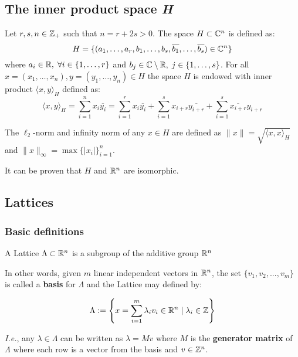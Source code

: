 \documentclass[a4paper,12pt]{article}
\begin{document}
\subsection{The inner product space \emph{H}}
\label{sec:org8f4e4a1}
\begin{definition}
  \label{def:h-space}
  Let $r,s,n \in \mathbb{Z}_+$ such that $n = r + 2s > 0$. The space $H \subset \mathbb{C}^n$ is defined
  as:
  \begin{equation*}
    H = \{(a_1,\dots, a_r, b_1,\dots, b_s, \overline{b_1}, \dots, \overline{b_s}) \in \mathbb{C}^n\}
  \end{equation*}
  where $a_i \in \mathbb{R}, \; \forall i \in \{1,\dots,r\}$ and $b_j \in \mathbb{C} \setminus \mathbb{R}, \; j \in \{1,\dots,
  s\}$. For all $x = \left(x_1, \dots, x_n\right), y = \left(y_1, \dots, y_n\right) \in H$ the space
  $H$ is endowed with inner product $\langle {x,y} \rangle_H$ defined as:
  \begin{equation*}
    \langle {x,y} \rangle_H = \sum_{i=1}^n{x_i \overline{y_i}} = \sum_{i=1}^r{x_i \overline{y_i}} + \sum_{i=1}^s{x_{i+r} \overline{y_{i+r}}} + \sum_{i=1}^s{\overline{x_{i+r}} y_{i+r}}
  \end{equation*}

  The $\ell_2$-norm and infinity norm of any $x \in H$ are defined as $\|x\| =
  \sqrt{\langle{x,x}\rangle_H}$ and $\|x\|_\infty = \max{\{ |x_i| \}}_{i=1}^n $.
\end{definition}

It can be proven that \(H\) and \(\mathbb{R}^n\) are isomorphic.
\subsection{Lattices}
\label{sec:org58b9d00}
\subsubsection{Basic definitions}
\label{sec:org34adb07}

   \begin{definition}
  A Lattice $\Lambda \subset \mathbb{R}^n$ is a subgroup of the additive group $\mathbb{R}^n$
\end{definition}

In other words, given \(m\) linear independent vectors in \(\mathbb{R}^n\), the set
\(\{v_1, v_2, ..., v_m\}\) is called a \textbf{basis} for \(\Lambda\) and the Lattice may defined
by:

\begin{definition}
  \begin{equation*}
    \Lambda := \left\{x = \sum_{i=1}^m{\lambda_iv_i} \in \mathbb{R}^n \; | \; \lambda_i \in \mathbb{Z}\right\}
  \end{equation*}

\emph{I.e.}, any $\lambda \in \Lambda$ can be written as $\lambda = Mv$ where $M$ is the
\textbf{generator matrix} of $\Lambda$ where each row is a vector from the basis and
$v \in \mathbb{Z}^n$.
\end{definition}
\end{document}
